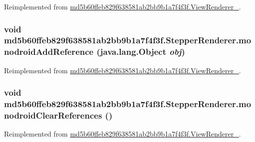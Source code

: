 Reimplemented from \hyperlink{classmd5b60ffeb829f638581ab2bb9b1a7f4f3f_1_1_view_renderer__2_a0898cf56fa9a49b653470eaf1608e77}{md5b60ffeb829f638581ab2bb9b1a7f4f3f.ViewRenderer\_}.\hypertarget{classmd5b60ffeb829f638581ab2bb9b1a7f4f3f_1_1_stepper_renderer_772f7be0ba769c29dffe9b37cca95502}{
\subsubsection[{monodroidAddReference}]{\setlength{\rightskip}{0pt plus 5cm}void md5b60ffeb829f638581ab2bb9b1a7f4f3f.StepperRenderer.monodroidAddReference (java.lang.Object {\em obj})}}
\label{classmd5b60ffeb829f638581ab2bb9b1a7f4f3f_1_1_stepper_renderer_772f7be0ba769c29dffe9b37cca95502}




Reimplemented from \hyperlink{classmd5b60ffeb829f638581ab2bb9b1a7f4f3f_1_1_view_renderer__2_64ca8244a89f60a47c173d9c0b15d610}{md5b60ffeb829f638581ab2bb9b1a7f4f3f.ViewRenderer\_}.\hypertarget{classmd5b60ffeb829f638581ab2bb9b1a7f4f3f_1_1_stepper_renderer_47b2498d2f24016154368d5bb6dd5843}{
\subsubsection[{monodroidClearReferences}]{\setlength{\rightskip}{0pt plus 5cm}void md5b60ffeb829f638581ab2bb9b1a7f4f3f.StepperRenderer.monodroidClearReferences ()}}
\label{classmd5b60ffeb829f638581ab2bb9b1a7f4f3f_1_1_stepper_renderer_47b2498d2f24016154368d5bb6dd5843}




Reimplemented from \hyperlink{classmd5b60ffeb829f638581ab2bb9b1a7f4f3f_1_1_view_renderer__2_dae20979ac761a65aa60c9b427509c37}{md5b60ffeb829f638581ab2bb9b1a7f4f3f.ViewRenderer\_}.

